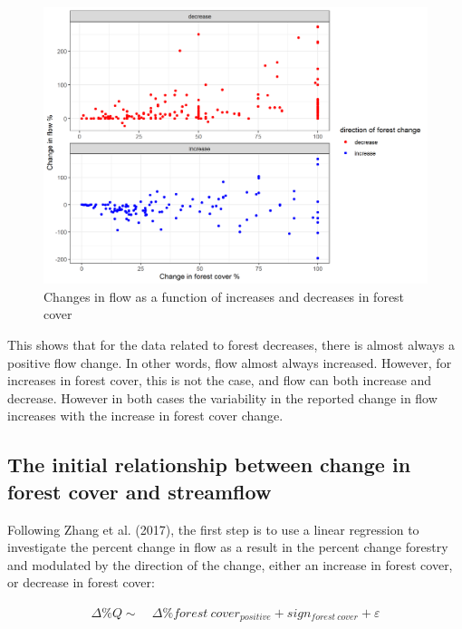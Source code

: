 \documentclass[]{elsarticle} %
\begin{document}
\begin{figure}
\includegraphics[width=0.9\linewidth]{Increase_decrease} \caption{Changes in flow as a function of increases and decreases in forest cover}\label{fig:increase_decrease}
\end{figure}

This shows that for the data related to forest decreases, there is
almost always a positive flow change. In other words, flow almost always
increased. However, for increases in forest cover, this is not the case,
and flow can both increase and decrease. However in both cases the
variability in the reported change in flow increases with the increase
in forest cover change.

\hypertarget{the-initial-relationship-between-change-in-forest-cover-and-streamflow}{%
\subsection{The initial relationship between change in forest cover and
streamflow}\label{the-initial-relationship-between-change-in-forest-cover-and-streamflow}}

Following Zhang et al. (2017), the first step is to use a linear
regression to investigate the percent change in flow as a result in the
percent change forestry and modulated by the direction of the change,
either an increase in forest cover, or decrease in forest cover:

\[\tag{3}
\begin{aligned}
\Delta \% Q \sim ~ &\Delta \% forest~cover_{positive} + sign_{forest~cover} + \varepsilon
\end{aligned}\]
\end{document}
